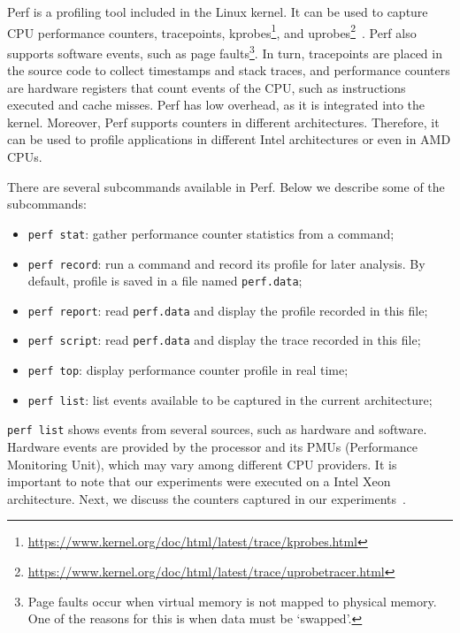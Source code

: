 
Perf is a profiling tool included in the Linux kernel. It can be used to capture CPU performance counters, tracepoints, kprobes\footnote{\url{https://www.kernel.org/doc/html/latest/trace/kprobes.html}}, and uprobes\footnote{\url{https://www.kernel.org/doc/html/latest/trace/uprobetracer.html}}~\cite{perf_wiki}. Perf also supports software events, such as page faults\footnote{Page faults occur when virtual memory is not mapped to physical memory. One of the reasons for this is when data must be `swapped'.}. In turn, tracepoints are placed in the source code to collect timestamps and stack traces, and performance counters are hardware registers that count events of the CPU, such as instructions executed and cache misses. Perf has low overhead, as it is integrated into the kernel. Moreover, Perf supports counters in different architectures. Therefore, it can be used to profile applications in different Intel architectures or even in AMD CPUs.

There are several subcommands available in Perf. Below we describe some of the subcommands:

\begin{itemize}
	\item \texttt{perf stat}: gather performance counter statistics from a command;
    \item \texttt{perf record}: run a command and record its profile for later analysis. By default, profile is saved in a file named \texttt{perf.data};
    \item \texttt{perf report}: read \texttt{perf.data} and display the profile recorded in this file;
    \item \texttt{perf script}: read \texttt{perf.data} and display the trace recorded in this file;
	\item \texttt{perf top}: display performance counter profile in real time;
	\item \texttt{perf list}: list events available to be captured in the current architecture;
\end{itemize}

\texttt{perf list} shows events from several sources, such as hardware and software. Hardware events are provided by the processor and its PMUs (Performance Monitoring Unit), which may vary among different CPU providers. It is important to note that our experiments were executed on a Intel Xeon architecture. Next, we discuss the counters captured in our experiments~\cite{intel_pmu}.

